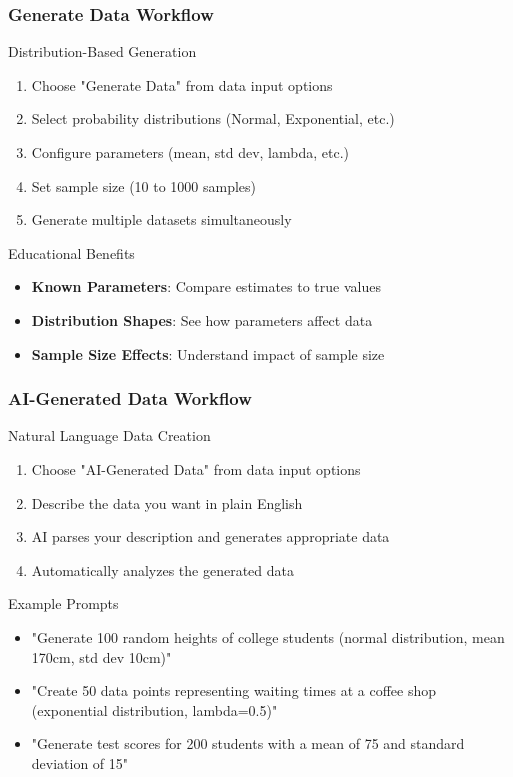 \documentclass[aspectratio=169]{beamer}
\begin{document}
\begin{frame}
\frametitle{Generate Data Workflow}
\begin{alertblock}{Distribution-Based Generation}
\begin{enumerate}
\item Choose "Generate Data" from data input options
\item Select probability distributions (Normal, Exponential, etc.)
\item Configure parameters (mean, std dev, lambda, etc.)
\item Set sample size (10 to 1000 samples)
\item Generate multiple datasets simultaneously
\end{enumerate}
\end{alertblock}

\begin{exampleblock}{Educational Benefits}
\begin{itemize}
\item \textbf{Known Parameters}: Compare estimates to true values
\item \textbf{Distribution Shapes}: See how parameters affect data
\item \textbf{Sample Size Effects}: Understand impact of sample size
\end{itemize}
\end{exampleblock}
\end{frame}

\begin{frame}
\frametitle{AI-Generated Data Workflow}
\begin{alertblock}{Natural Language Data Creation}
\begin{enumerate}
\item Choose "AI-Generated Data" from data input options
\item Describe the data you want in plain English
\item AI parses your description and generates appropriate data
\item Automatically analyzes the generated data
\end{enumerate}
\end{alertblock}

\begin{exampleblock}{Example Prompts}
\begin{itemize}
\item "Generate 100 random heights of college students (normal distribution, mean 170cm, std dev 10cm)"
\item "Create 50 data points representing waiting times at a coffee shop (exponential distribution, lambda=0.5)"
\item "Generate test scores for 200 students with a mean of 75 and standard deviation of 15"
\end{itemize}
\end{exampleblock}
\end{frame}
\end{document}
